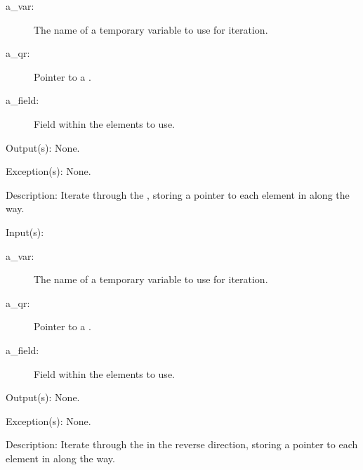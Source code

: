 \begin{capi}
\begin{capilist}
\begin{description}
		\item[a\_var: ]
			The name of a temporary variable to use for iteration.
		\item[a\_qr: ]
			Pointer to a .
		\item[a\_field: ]
			Field within the  elements to use.
		\end{description}
	\item[Output(s): ] None.
	\item[Exception(s): ] None.
	\item[Description: ]
		Iterate through the , storing a pointer to each
		element in  along the way.
	\end{capilist}
\label{qr_reverse_foreach}
	\begin{capilist}
	\item[Input(s): ]
		\begin{description}\item[]
		\item[a\_var: ]
			The name of a temporary variable to use for iteration.
		\item[a\_qr: ]
			Pointer to a .
		\item[a\_field: ]
			Field within the  elements to use.
		\end{description}
	\item[Output(s): ] None.
	\item[Exception(s): ] None.
	\item[Description: ]
		Iterate through the  in the reverse direction,
		storing a pointer to each element in  along the
		way.
	\end{capilist}
\end{capi}

